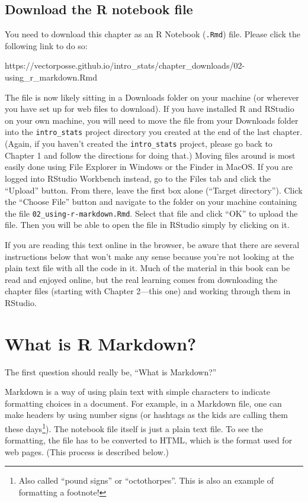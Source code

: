 \documentclass[
]{book}
\begin{document}
\hypertarget{rmark-download}{%
\subsection{Download the R notebook file}\label{rmark-download}}

You need to download this chapter as an R Notebook (\texttt{.Rmd}) file. Please click the following link to do so:

https://vectorposse.github.io/intro\_stats/chapter\_downloads/02-using\_r\_markdown.Rmd

The file is now likely sitting in a Downloads folder on your machine (or wherever you have set up for web files to download). If you have installed R and RStudio on your own machine, you will need to move the file from your Downloads folder into the \texttt{intro\_stats} project directory you created at the end of the last chapter. (Again, if you haven't created the \texttt{intro\_stats} project, please go back to Chapter 1 and follow the directions for doing that.) Moving files around is most easily done using File Explorer in Windows or the Finder in MacOS. If you are logged into RStudio Workbench instead, go to the Files tab and click the ``Upload'' button. From there, leave the first box alone (``Target directory''). Click the ``Choose File'' button and navigate to the folder on your machine containing the file \texttt{02\_using-r-markdown.Rmd}. Select that file and click ``OK'' to upload the file. Then you will be able to open the file in RStudio simply by clicking on it.

If you are reading this text online in the browser, be aware that there are several instructions below that won't make any sense because you're not looking at the plain text file with all the code in it. Much of the material in this book can be read and enjoyed online, but the real learning comes from downloading the chapter files (starting with Chapter 2---this one) and working through them in RStudio.

\hypertarget{rmark-whatis}{%
\section{What is R Markdown?}\label{rmark-whatis}}

The first question should really be, ``What is Markdown?''

Markdown is a way of using plain text with simple characters to indicate formatting choices in a document. For example, in a Markdown file, one can make headers by using number signs (or hashtags as the kids are calling them these days\footnote{Also called ``pound signs'' or ``octothorpes''. This is also an example of formatting a footnote!}). The notebook file itself is just a plain text file. To see the formatting, the file has to be converted to HTML, which is the format used for web pages. (This process is described below.)
\end{document}
